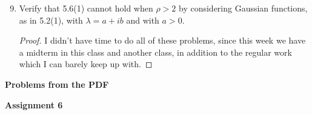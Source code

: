 \documentclass[12pt,letterpaper]{article}
\begin{document}
\begin{enumerate}
\setcounter{enumi}{8}
\item Verify that 5.6(1) cannot hold when $\rho > 2$ by considering Gaussian 
functions, as in 5.2(1), with $\lambda=a+ib$ and with $a>0$. 

\begin{proof}
I didn't have time to do all of these problems, since this week we have a midterm in this class and another class, in addition to the regular work which I can barely keep up with. 
\end{proof}


\end{enumerate}

\textbf{Problems from the PDF}

\textbf{Assignment 6}
\end{document}
